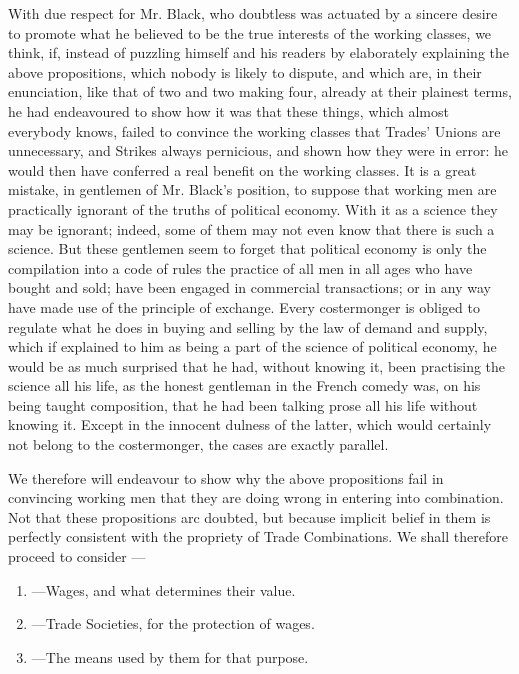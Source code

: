 \documentclass[12pt, a4paper]{book}
\begin{document}
    With due respect for Mr. Black, who doubtless was actuated by a
    sincere desire to promote what he believed to be the true interests
    of the working classes, we think, if, instead of puzzling himself
    and his readers by elaborately explaining the above propositions,
    which nobody is likely to dispute, and which are, in their
    enunciation, like that of two and two making four, already at their
    plainest terms, he had endeavoured to show how it was that these
    things, which almost everybody knows, failed to convince the working
    classes that Trades' Unions are unnecessary, and Strikes always
    pernicious, and shown how they were in error: he would then have
    conferred a real benefit on the working classes. It is a great
    mistake, in gentlemen of Mr. Black's position, to suppose that
    working men are practically ignorant of the truths of political
    economy. With it as a science they may be ignorant; indeed, some of
    them may not even know that there is such a science. But these
    gentlemen seem to forget that political economy is only the
    compilation into a code of rules the practice of all men in all ages
    who have bought and sold; have been engaged in commercial
    transactions; or in any way have made use of the principle of
    exchange. Every costermonger is obliged to regulate what he does in
    buying and selling by the law of demand and supply, which if
    explained to him as being a part of the science of political
    economy, he would be as much surprised that he had, without knowing
    it, been practising the science all his life, as the honest
    gentleman in the French comedy was, on his being taught composition,
    that he had been talking prose all his life without knowing it.
    Except in the innocent dulness of the latter, which would certainly
    not belong to the costermonger, the cases are exactly parallel.

    We therefore will endeavour to show why the above propositions fail
    in convincing working men that they are doing wrong in entering into
    combination. Not that these propositions arc doubted, but because
    implicit belief in them is perfectly consistent with the propriety
    of Trade Combinations. We shall therefore proceed to consider ---

    \begin{enumerate}[label=\Roman*., leftmargin=2.9cm]
        \item---Wages, and what determines their value.
        \item---Trade Societies, for the protection of wages.
        \item---The means used by them for that purpose.
    \end{enumerate}

    
    
    
\end{document}
